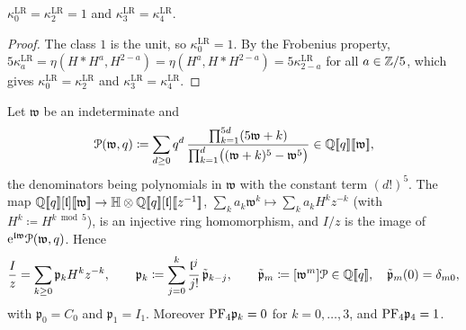 \begin{lem}
\label{lem:set-unitfrob}
$\kappa^{\mathrm{LR}}_0=\kappa^{\mathrm{LR}}_2=1$ and $\kappa^{\mathrm{LR}}_3=\kappa^{\mathrm{LR}}_4$.
\end{lem}

\begin{proof}
The class $1$ is the unit, so $\kappa^{\mathrm{LR}}_0=1$. By the Frobenius property, $5\kappa^{\mathrm{LR}}_a=\eta(H*H^a,H^{2-a})=\eta(H^a,H*H^{2-a})=5\kappa^{\mathrm{LR}}_{2-a}$ for all $a\in\mathbb{Z}/5$, which gives $\kappa^{\mathrm{LR}}_0=\kappa^{\mathrm{LR}}_2$ and $\kappa^{\mathrm{LR}}_3=\kappa^{\mathrm{LR}}_4$.
\end{proof}

\begin{lem}
\label{lem:set-periods}
Let $\mathfrak w$ be an indeterminate and
\[
\mathcal{P}(\mathfrak w,q)\coloneqq\sum_{d\geq0}q^d\,\frac{\prod_{k=1}^{5d}(5\mathfrak w+k)}{\prod_{k=1}^d\bigl((\mathfrak w+k)^5-\mathfrak w^5\bigr)}\in\mathbb{Q}[\![ q ]\!][\![ \mathfrak w ]\!],
\]
the denominators being polynomials in $\mathfrak w$ with the constant term $(d!)^5$. The map $\bbQ\fps q[\logq]\fps{\mathfrak w}\to\bbH\otimes\bbQ\fps q[\logq]\fps{z^{-1}}$, $\sum_ka_k\mathfrak w^k\mapsto\sum_ka_kH^kz^{-k}$ (with $H^k\coloneqq H^{k\bmod5}$), is an injective ring homomorphism, and $I/z$ is the image of $\mathrm{e}^{\mathfrak{l}\mathfrak w}\mathcal{P}(\mathfrak w,q)$. Hence
\[
\frac Iz=\sum_{k\geq0}\mathfrak p_kH^kz^{-k},\qquad\mathfrak p_k\coloneqq\sum_{j=0}^k\frac{\mathfrak{l}^j}{j!}\,\tilde{\mathfrak p}_{k-j},\qquad\tilde{\mathfrak p}_m\coloneqq[\mathfrak w^m]\mathcal{P}\in\mathbb{Q}[\![ q ]\!],\quad\tilde{\mathfrak p}_m(0)=\delta_{m0},
\]
with $\mathfrak p_0=C_0$ and $\mathfrak p_1=I_1$. Moreover $\mathrm{PF}_{4}\mathfrak p_k=0$ for $k=0,\dots,3$, and $\mathrm{PF}_{4}\mathfrak p_4=1$.
\end{lem}

